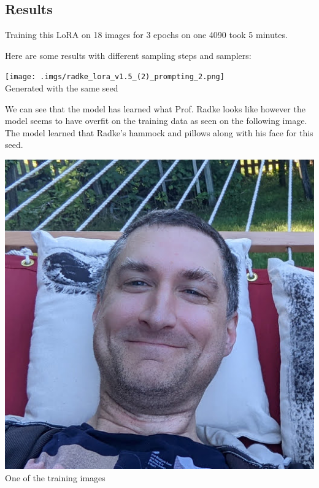 \documentclass{article}
\begin{document}
\newpage


\subsection{Results}
Training this LoRA on 18 images for 3 epochs on one 4090 took 5 minutes.

\noindent Here are some results with different sampling steps and samplers:
\begin{center}
    \texttt{[image: .imgs/radke\_lora\_v1.5\_(2)\_prompting\_2.png]} \\
    Generated with the same seed
\end{center}
We can see that the model has learned what Prof. Radke looks like however the model seems to have overfit on the training data as seen on the following image. The model learned that Radke's hammock and pillows along with his face for this seed.
\begin{center}
    \includegraphics[scale=0.2]{.imgs/radke_overfitting_2.jpg} \\
    One of the training images
\end{center}
\end{document}
